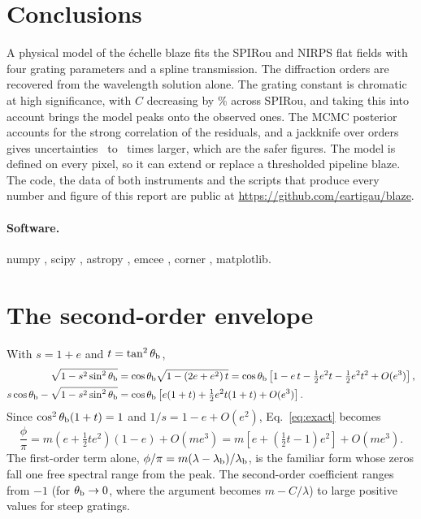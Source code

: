 \documentclass[11pt,a4paper]{article}
\newcommand{\lamb}{\lambda_{\rm b}}
\begin{document}
\section{Conclusions}

A physical model of the \'echelle blaze fits the SPIRou and NIRPS flat fields with four grating parameters and a spline transmission. The diffraction orders are recovered from the wavelength solution alone. The grating constant is chromatic at high significance, with $C$ decreasing by \spChangeAbs\% across SPIRou, and taking this into account brings the model peaks onto the observed ones. The MCMC posterior accounts for the strong correlation of the residuals, and a jackknife over orders gives uncertainties \MinRatio\ to \MaxRatio\ times larger, which are the safer figures. The model is defined on every pixel, so it can extend or replace a thresholded pipeline blaze. The code, the data of both instruments and the scripts that produce every number and figure of this report are public at \url{https://github.com/eartigau/blaze}.

\paragraph{Software.} numpy \citep{Harris2020}, scipy \citep{Virtanen2020}, astropy \citep{Astropy2022}, emcee \citep{ForemanMackey2013}, corner \citep{ForemanMackey2016}, matplotlib.




\clearpage
\appendix

\section{The second-order envelope}
\label{app:expansion}

With $s = 1+e$ and $t=\tan^2\theta_{\rm b}$,
\begin{align}
\sqrt{1-s^2\sin^2\theta_{\rm b}}
&= \cos\theta_{\rm b}\sqrt{1-(2e+e^2)\,t}
= \cos\theta_{\rm b}\left[1 - e\,t - \tfrac12 e^2 t - \tfrac12 e^2 t^2 + O(e^3)\right],\\
s\cos\theta_{\rm b}-\sqrt{1-s^2\sin^2\theta_{\rm b}}
&= \cos\theta_{\rm b}\left[e(1+t) + \tfrac12 e^2 t(1+t) + O(e^3)\right].
\end{align}
Since $\cos^2\theta_{\rm b}(1+t) = 1$ and $1/s = 1-e+O(e^2)$, Eq.~\ref{eq:exact} becomes
\begin{equation}
\frac{\phi}{\pi} = m\left(e + \tfrac12 t e^2\right)(1-e) + O(me^3) = m\left[e + \left(\tfrac12 t - 1\right)e^2\right] + O(me^3).
\end{equation}
The first-order term alone, $\phi/\pi = m(\lambda-\lamb)/\lamb$, is the familiar form whose zeros fall one free spectral range from the peak. The second-order coefficient ranges from $-1$ (for $\theta_{\rm b}\to0$, where the argument becomes $m - C/\lambda$) to large positive values for steep gratings.
\end{document}
